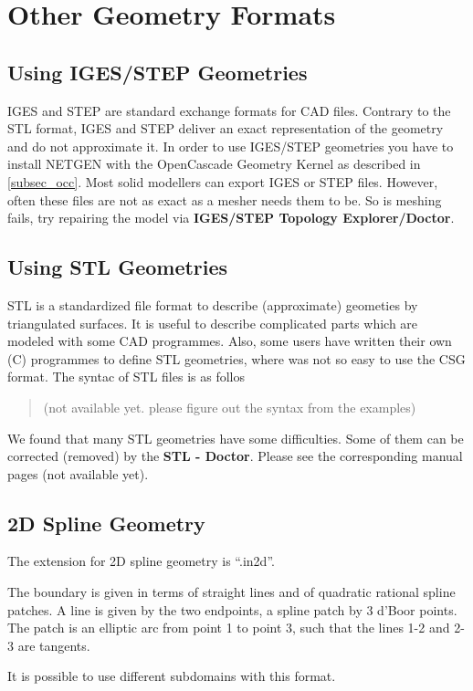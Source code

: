 \documentclass[12pt]{book}
\begin{document}
\chapter{Other Geometry Formats}

\section{Using IGES/STEP Geometries}
%
IGES and STEP are standard exchange formats for CAD files. Contrary to the STL format, IGES and STEP deliver an exact representation of the geometry and do not approximate it. In order to use IGES/STEP geometries you have to install NETGEN with the OpenCascade Geometry Kernel as described in \ref{subsec_occ}. Most solid modellers can export IGES or STEP files. However, often these files are not as exact as a mesher needs them to be. So is meshing fails, try repairing the model via {\bf IGES/STEP Topology Explorer/Doctor}.

\section{Using STL Geometries}
%
STL is a standardized file format to describe (approximate) geometies
by triangulated surfaces. It is useful to describe complicated parts
which are modeled with some CAD programmes. Also, some users have written
their own (C) programmes to define STL geometries, where was not so easy
to use the CSG format. The syntac of STL files is as follos
\begin{quote}
(not available yet. please figure out the syntax from the examples)
\end{quote}

We found that many STL geometries have some difficulties. Some of them
can be corrected (removed) by the {\bf STL - Doctor}. Please see the
corresponding manual pages (not available yet).


\section{2D Spline Geometry}
%
The extension for 2D spline geometry is ``.in2d''.

The boundary is given in terms of straight lines and of quadratic rational
spline patches. 
A line is given by the two endpoints, a spline patch by 3 d'Boor
points. The patch is an elliptic arc from point 1 to point 3, such that
the lines 1-2 and 2-3 are tangents.

It is possible to use different subdomains with this format.
\end{document}
